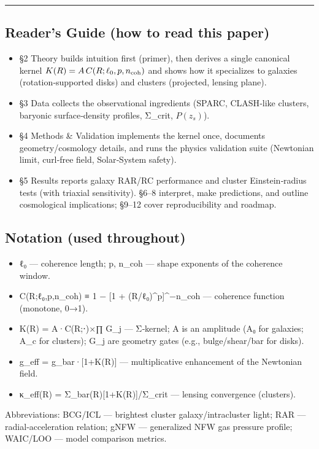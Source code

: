 \documentclass[11pt,a4paper]{article}
\begin{document}
\medskip\hrule\medskip


\subsection{Reader’s Guide (how to read this paper)}


\begin{itemize}
\item §2 Theory builds intuition first (primer), then derives a single canonical kernel $K(R)=A\,C(R;\ell_0,p,n_{\rm coh})$ and shows how it specializes to galaxies (rotation‑supported disks) and clusters (projected, lensing plane).
\item §3 Data collects the observational ingredients (SPARC, CLASH‑like clusters, baryonic surface‑density profiles, Σ\_crit, $P(z_s)$).
\item §4 Methods \& Validation implements the kernel once, documents geometry/cosmology details, and runs the physics validation suite (Newtonian limit, curl‑free field, Solar‑System safety).
\item §5 Results reports galaxy RAR/RC performance and cluster Einstein‑radius tests (with triaxial sensitivity). §6–8 interpret, make predictions, and outline cosmological implications; §9–12 cover reproducibility and roadmap.
\end{itemize}


\subsection{Notation (used throughout)}


\begin{itemize}
\item ℓ₀ — coherence length; p, n\_coh — shape exponents of the coherence window.
\item C(R;ℓ₀,p,n\_coh) ≡ 1 − [1 + (R/ℓ₀)^p]^{−n\_coh} — coherence function (monotone, 0→1).
\item K(R) = A·C(R;⋅)×∏ G\_j — Σ‑kernel; A is an amplitude (A₀ for galaxies; A\_c for clusters); G\_j are geometry gates (e.g., bulge/shear/bar for disks).
\item g\_eff = g\_bar·[1+K(R)] — multiplicative enhancement of the Newtonian field.
\item κ\_eff(R) = Σ\_bar(R)[1+K(R)]/Σ\_crit — lensing convergence (clusters).
\end{itemize}


Abbreviations: BCG/ICL — brightest cluster galaxy/intracluster light; RAR — radial‑acceleration relation; gNFW — generalized NFW gas pressure profile; WAIC/LOO — model comparison metrics.
\end{document}
